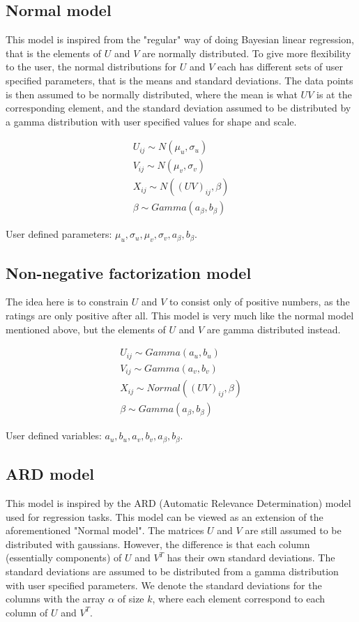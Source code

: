 \documentclass[12pt]{article}
\begin{document}
    \subsection{Normal model}
    This model is inspired from the "regular" way of doing Bayesian linear regression, that is the elements of $U$ and $V$ are normally distributed. To give more flexibility to the user, the normal distributions for $U$ and $V$ each has different sets of user specified parameters, that is the means and standard deviations. The data points is then assumed to be normally distributed, where the mean is what $UV$ is at the corresponding element, and the standard deviation assumed to be distributed by a gamma distribution with user specified values for shape and scale.

    \begin{align*}
        U_{ij} \sim N(\mu_u, \sigma_u) \\
        V_{ij} \sim N(\mu_v, \sigma_v) \\
        X_{ij}\sim N((UV)_{ij}, \beta) \\
        \beta \sim Gamma(a_\beta, b_\beta) 
    \end{align*}

    User defined parameters: $\mu_u, \sigma_u, \mu_v, \sigma_v, a_\beta, b_\beta$.
    
    \subsection{Non-negative factorization model}
    The idea here is to constrain $U$ and $V$ to consist only of positive numbers, as the ratings are only positive after all. This model is very much like the normal model mentioned above, but the elements of $U$ and $V$ are gamma distributed instead.

    \begin{align*}
        U_{ij}\sim Gamma(a_u, b_u) \\
        V_{ij}\sim Gamma(a_v, b_v) \\
        X_{ij}\sim Normal((UV)_{ij}, \beta) \\
        \beta \sim Gamma(a_\beta, b_\beta) 
    \end{align*}

    User defined variables: $a_u, b_u, a_v, b_v, a_\beta, b_\beta$.
    
    \subsection{ARD model}
    This model is inspired by the ARD (Automatic Relevance Determination) model used for regression tasks. This model can be viewed as an extension of the aforementioned "Normal model". The matrices $U$ and $V$ are still assumed to be distributed with gaussians. However, the difference is that each column (essentially components) of $U$ and $V^T$ has their own standard deviations. The standard deviations are assumed to be distributed from a gamma distribution with user specified parameters. We denote the standard deviations for the columns with the array $\alpha$ of size $k$, where each element correspond to each column of $U$ and $V^T$.
\end{document}
